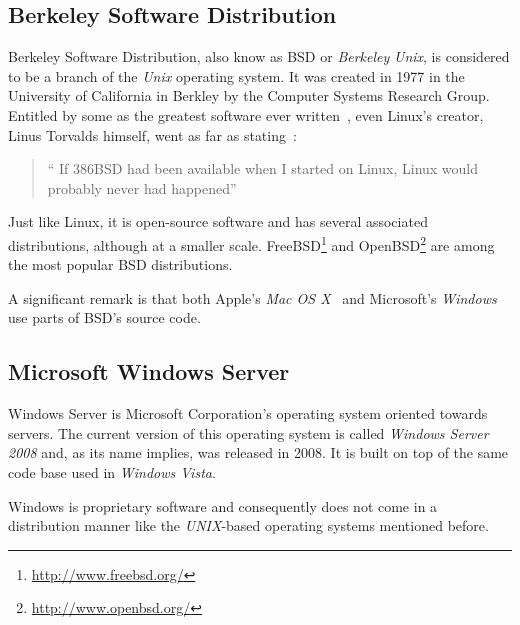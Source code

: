 \subsection{Berkeley Software Distribution}
Berkeley Software Distribution, also know as BSD or \textit{Berkeley} \textit{Unix}, is considered to be a branch of the \textit{Unix} operating system. It was created in 1977 in the University of California in Berkley by the Computer Systems Research Group.  Entitled by some as the greatest software ever written~\cite{ greatest_software_ever_written}, even Linux's creator, Linus Torvalds himself, went as far as stating~\cite{ interview_linus}: 
\begin{quote}
  `` If 386BSD had been available when I started on Linux, Linux would probably never had happened''
\end{quote}
Just like Linux, it is open-source software and has several associated distributions, although at a smaller scale. FreeBSD\footnote{\url{http://www.freebsd.org/}} and OpenBSD\footnote{\url{http://www.openbsd.org/}} are among the most popular BSD distributions.

A significant remark is that both Apple's \textit{Mac OS X}~\cite{leopard_os_foundations} and Microsoft's \textit{Windows}~\cite{bsd_code_windows} use parts of BSD's source code.

\subsection{Microsoft Windows Server}
Windows Server is Microsoft Corporation's operating system oriented towards servers. The current version of this operating system is called \textit{Windows Server 2008} and, as its name implies, was released in 2008. It is built on top of the same code base used in \textit{Windows Vista}.

Windows is proprietary software and consequently does not come in a distribution manner like the \textit{UNIX}-based operating systems mentioned before.
